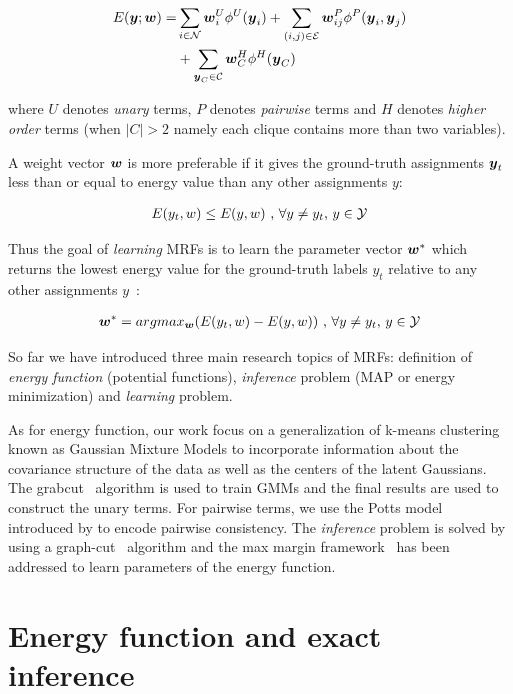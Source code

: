 \begin{align}
  \label{eq:energyfunction_UPH}
  E(\by;\bw)=&\sum_{i\in \N}{\bw_i^U\phi^U(\by_i)}+
               \sum_{(i,j)\in \E}{\bw_{ij}^P\phi^P(\by_i,\by_j)} \notag \\
               &+\sum_{\by_C\in \C}{\bw_C^H\phi^H(\by_C)}
\end{align}

\noindent where $U$ denotes \emph{unary} terms, $P$ denotes
\emph{pairwise} terms and $H$ denotes \emph{higher order} terms
(when $|C|>2$ namely each clique contains more than two
variables).

A weight vector ${\boldsymbol{w}}$ is more preferable if it gives the
ground-truth assignments ${\boldsymbol{y}}_t$ less than or equal to energy
value than any other assignments $y$:

\begin{align}
E(y_t,w)\leq E(y,w)~ \text{,~}\forall y \neq y_t
\text{,~} y\in \Y
\end{align}


Thus the goal of \emph{learning} MRFs is to learn the parameter
vector ${\boldsymbol{w}}^*$ which returns the lowest energy value for the
ground-truth labels $y_t$ relative to any other assignments
$y$~\cite{Szummer:ECCV08}:

\begin{align}
\bw^* = argmax_{\bw}(E(y_t,w)-E(y,w))~ \text{,~}\forall y \neq y_t
\text{,~} y\in \Y
\end{align}

So far we have introduced three main research topics of MRFs:
definition of \emph{energy function} (potential functions),
\emph{inference} problem (MAP or energy minimization) and
\emph{learning} problem.

As for energy function, our work focus on a generalization of
k-means clustering known as Gaussian Mixture Models to
incorporate information about the covariance structure of the
data as well as the centers of the latent Gaussians. The
grabcut~\cite{Rother:SIGGRAPH04} algorithm is used to train GMMs
and the final results are used to construct the unary terms. For
pairwise terms, we use the Potts model introduced by
 to encode pairwise consistency. The
\emph{inference} problem is solved by using a
graph-cut~\cite{Boykov:ICCV99, Boykov:PAMI04} algorithm and the
max margin framework~\cite{tsochantaridis2005large} has been
addressed to learn parameters of the energy function.

\section{Energy function and exact inference}
\label{sec:energy_and_inference}



